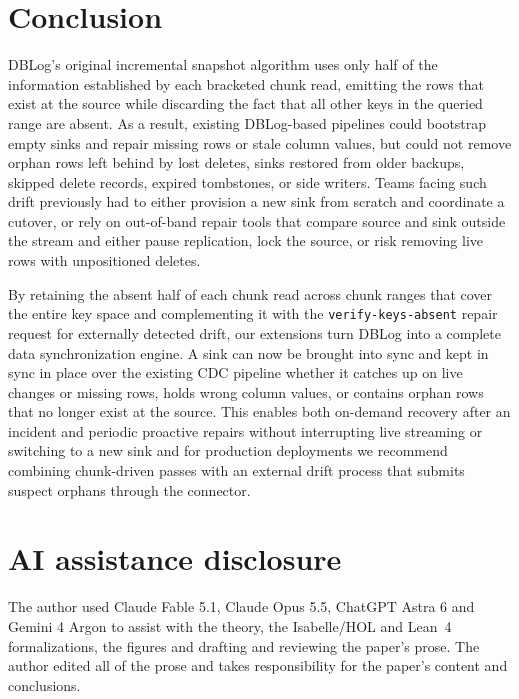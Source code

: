 \documentclass[sigconf,nonacm,10pt]{acmart}
\begin{document}
\section{Conclusion}\label{sec:future}

DBLog's original incremental snapshot algorithm uses only half of the
information established by each bracketed chunk read, emitting the rows that
exist at the source while discarding the fact that all other keys in the queried
range are absent. As a result, existing DBLog-based pipelines could bootstrap
empty sinks and repair missing rows or stale column values, but could not remove
orphan rows left behind by lost deletes, sinks restored from older backups,
skipped delete records, expired tombstones, or side writers. Teams facing such drift previously had to either provision
a new sink from scratch and coordinate a cutover, or rely on out-of-band repair tools that compare source and sink outside the
stream and either pause replication, lock the source, or risk removing live
rows with unpositioned deletes.

By retaining the absent half of each chunk read across chunk ranges that cover the entire key
space and complementing it with the \texttt{verify-keys-absent}
repair request for externally detected drift, our extensions turn DBLog into a
complete data synchronization engine. A sink can now be brought into sync and
kept in sync in place over the existing CDC pipeline whether it catches up on
live changes or missing rows, holds wrong
column values, or contains orphan rows that no
longer exist at the source. This enables both on-demand recovery after an
incident and periodic proactive repairs without interrupting live streaming or
switching to a new sink and for production deployments we recommend combining
chunk-driven passes with an external drift process that submits suspect orphans 
through the connector.

\section*{AI assistance disclosure}

The author used Claude Fable 5.1, Claude Opus 5.5, ChatGPT Astra 6 and
Gemini 4 Argon to assist with the theory, the Isabelle/HOL and Lean~4
formalizations, the figures and drafting and reviewing the paper's prose. The
author edited all of the prose and takes responsibility for the paper's content
and conclusions.



\end{document}
